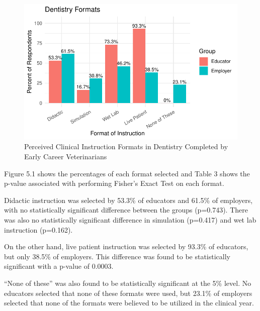 \documentclass[
  11pt,
  letterpaper,
  DIV=11,
  numbers=noendperiod]{scrartcl}
\numberwithin{figure}{section}
\begin{document}
\begin{figure}[H]

{\centering \includegraphics{Final-Project_files/figure-pdf/formatgraph-1.pdf}

}

\caption{Perceived Clinical Instruction Formats in Dentistry Completed
by Early Career Veterinarians}

\end{figure}

Figure 5.1 shows the percentages of each format selected and Table 3
shows the p-value associated with performing Fisher's Exact Test on each
format.

Didactic instruction was selected by 53.3\% of educators and 61.5\% of
employers, with no statistically significant difference between the
groups (p=0.743). There was also no statistically significant difference
in simulation (p=0.417) and wet lab instruction (p=0.162).

On the other hand, live patient instruction was selected by 93.3\% of
educators, but only 38.5\% of employers. This difference was found to be
statistically significant with a p-value of 0.0003.

``None of these'' was also found to be statistically significant at the
5\% level. No educators selected that none of these formats were used,
but 23.1\% of employers selected that none of the formats were believed
to be utilized in the clinical year.
\end{document}
